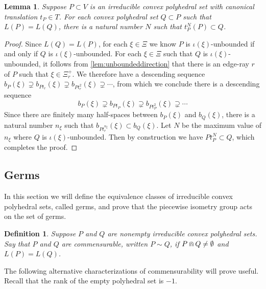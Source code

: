 \documentclass[11pt]{amsart}
\newtheorem{lemma}[theorem]{Lemma}
\newtheorem{definition}[theorem]{Definition}
\numberwithin{table}{section}
\numberwithin{figure}{section}
\theoremstyle{remark}
\begin{document}
\begin{lemma} \label{lem:translation-inside} Suppose $P\subset V$ is
  an irreducible convex polyhedral set with canonical translation
  $t_P \in T$. For each convex polyhedral set $Q \subset P$ such that
  $L(P) = L(Q)$, there is a natural number $N$ such
  that $t_P^N(P) \subset Q$.
\end{lemma}
\begin{proof}
  Since $L(Q) = L(P)$, for each $\xi \in \Xi$ we know $P$ is
  $\iota(\xi)$-unbounded if and only if $Q$ is
  $\iota(\xi)$-unbounded. For each $\xi \in \Xi$ such that $Q$ is
  $\iota(\xi)$-unbounded, it follows from \cref{lem:unboundeddirection}
  that there is an edge-ray $r$ of $P$ such that $\xi \in \Xi_r^+$. We
  therefore have a descending sequence
  $b_P(\xi) \supsetneq b_{P t_r}(\xi) \supsetneq b_{P t^2_r}(\xi)
  \supsetneq \dotsb$, from which we conclude there is a descending
  sequence
  \[
    b_P(\xi) \supsetneq b_{P t_P}(\xi) \supsetneq
    b_{P t^2_P}(\xi) \supsetneq \dotsb
  \]
  Since there are finitely many half-spaces between $b_P(\xi)$ and
  $b_Q(\xi)$, there is a natural number $n_\xi$ such that
  $b_{P t_r^{n_\xi}}(\xi) \subset b_Q(\xi)$. Let $N$ be the
  maximum value of $n_\xi$ where $Q$ is
  $\iota(\xi)$-unbounded. Then by construction we have
  $P t_P^N \subset Q$, which completes the proof.
\end{proof}


\subsection{Germs}

In this section we will define the equivalence classes of irreducible
convex polyhedral sets, called germs, and prove that the piecewise
isometry group acts on the set of germs.

\begin{definition}
  Suppose $P$ and $Q$ are nonempty irreducible convex polyhedral
  sets. Say that $P$ and $Q$ are {\em commensurable}, written
  $P\sim Q$, if $P\doublecap Q \neq \emptyset$ and $L(P) = L(Q)$.
\end{definition}

The following alternative characterizations of commensurability will
prove useful. Recall that the rank of the empty polyhedral set is $-1$.
\end{document}
